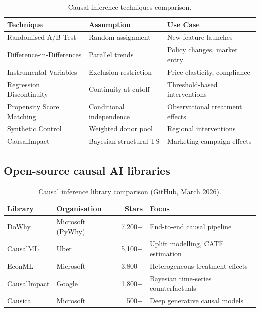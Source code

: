 \documentclass[preprint,12pt,authoryear]{elsarticle}
\theoremstyle{definition}
\begin{document}
\begin{table}[ht]
\centering
\caption{Causal inference techniques comparison.}
\label{tab:causal-techniques}
\begin{tabular}{lll}
\toprule
\textbf{Technique} & \textbf{Assumption} & \textbf{Use Case} \\
\midrule
Randomised A/B Test      & Random assignment          & New feature launches \\
Difference-in-Differences & Parallel trends           & Policy changes, market entry \\
Instrumental Variables    & Exclusion restriction      & Price elasticity, compliance \\
Regression Discontinuity  & Continuity at cutoff      & Threshold-based interventions \\
Propensity Score Matching & Conditional independence   & Observational treatment effects \\
Synthetic Control         & Weighted donor pool        & Regional interventions \\
CausalImpact             & Bayesian structural TS     & Marketing campaign effects \\
\bottomrule
\end{tabular}
\end{table}

\subsection{Open-source causal AI libraries}

\begin{table}[ht]
\centering
\caption{Causal inference library comparison (GitHub, March 2026).}
\label{tab:causal-tools}
\begin{tabular}{llrl}
\toprule
\textbf{Library} & \textbf{Organisation} & \textbf{Stars} & \textbf{Focus} \\
\midrule
DoWhy       & Microsoft (PyWhy) & 7,200+  & End-to-end causal pipeline \\
CausalML    & Uber              & 5,100+  & Uplift modelling, CATE estimation \\
EconML      & Microsoft         & 3,800+  & Heterogeneous treatment effects \\
CausalImpact & Google           & 1,800+  & Bayesian time-series counterfactuals \\
Causica     & Microsoft         & 500+    & Deep generative causal models \\
\bottomrule
\end{tabular}
\end{table}
\end{document}
